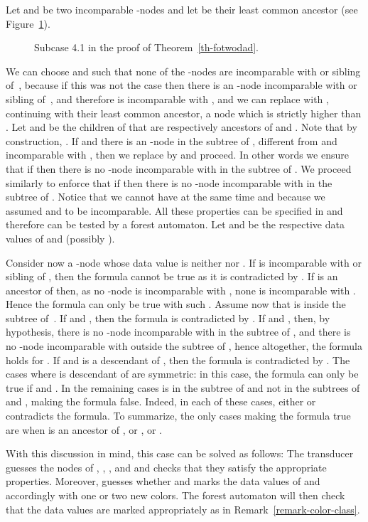\documentclass{CSML}
\begin{document}
Let  and  be two incomparable -nodes and let  
be their least common ancestor
(see Figure~\ref{fig:case41a}).
\begin{figure}

\caption{Subcase 4.1 in the proof of Theorem~\ref{th-fotwodad}.}
\label{fig:case41a}
\end{figure}
 We can choose  and  such that none of the
-nodes are incomparable with  or sibling of~, because if this was not
the case then there is an -node  incomparable with  or sibling of~, 
and therefore  is incomparable with , and we can replace  with
, continuing with their least common ancestor, 
a node which is strictly higher than . 
Let  and  be the children of  
that are respectively ancestors of  and . 
Note that by construction, . 
If  and there is an -node  in the subtree of , 
different from  and incomparable with , 
then we replace  by  and proceed. 
In other words we ensure that if  
then there is no -node incomparable with  in the subtree of . 
We proceed similarly
to enforce that if  then there is no
-node incomparable with  in the subtree of . 
Notice that we cannot have at the same time  and 
because we assumed  and  to be incomparable. 
All these properties can be specified in  and therefore can be tested 
by a forest automaton.  
Let  and  be the respective data values of  and  (possibly ).

Consider now a -node  whose data value is neither  nor .
If  is incomparable with  or sibling of , then the formula cannot be true as
it is contradicted by .  If  is an ancestor of  then, as no
-node is incomparable with , none is incomparable with . 
Hence the formula can only be true with such .
Assume now that  is inside the subtree of~. 
If  and , then the formula is contradicted by .
If  and , then, by hypothesis, 
there is no -node incomparable with  in the subtree of , 
and there is no -node incomparable with  outside the subtree of ,
hence altogether, the formula holds for .
If  and  is a descendant of , 
then the formula is contradicted by .
The cases where  is descendant of  are symmetric:
in this case, the formula can only be true if  and .
In the remaining cases  is in the subtree of  and not in the subtrees of
 and , making the formula false. Indeed, in each of these cases, either
 or  contradicts the formula.
To summarize, the only cases making the formula true
are when  is an ancestor of , 
or ,
or .
 

With this discussion in mind, this case can be solved as follows:
The transducer  guesses the nodes of , , ,  and 
and checks that they satisfy the appropriate properties. 
Moreover,  guesses whether  
and marks the data values of  and  accordingly
with one or two new colors. 
The forest automaton  will then check that the data values are marked
appropriately as in Remark~\ref{remark-color-class}.
\end{document}
